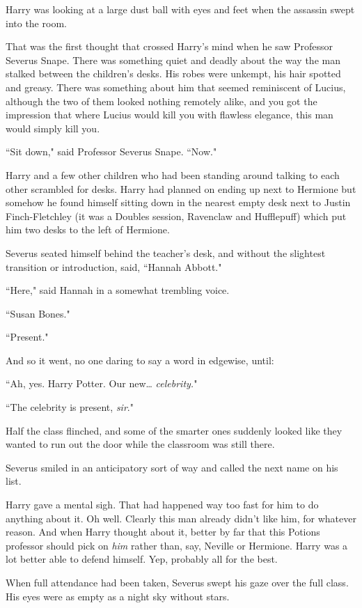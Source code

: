 Harry was looking at a large dust ball with eyes and feet when the assassin swept into the room.

That was the first thought that crossed Harry's mind when he saw Professor Severus Snape. There was something quiet and deadly about the way the man stalked between the children's desks. His robes were unkempt, his hair spotted and greasy. There was something about him that seemed reminiscent of Lucius, although the two of them looked nothing remotely alike, and you got the impression that where Lucius would kill you with flawless elegance, this man would simply kill you.

``Sit down," said Professor Severus Snape. ``Now."

Harry and a few other children who had been standing around talking to each other scrambled for desks. Harry had planned on ending up next to Hermione but somehow he found himself sitting down in the nearest empty desk next to Justin Finch-Fletchley (it was a Doubles session, Ravenclaw and Hufflepuff) which put him two desks to the left of Hermione.

Severus seated himself behind the teacher's desk, and without the slightest transition or introduction, said, ``Hannah Abbott."

``Here," said Hannah in a somewhat trembling voice.

``Susan Bones."

``Present."

And so it went, no one daring to say a word in edgewise, until:

``Ah, yes. Harry Potter. Our new{\ldots} \emph{celebrity.}"

``The celebrity is present, \emph{sir}."

Half the class flinched, and some of the smarter ones suddenly looked like they wanted to run out the door while the classroom was still there.

Severus smiled in an anticipatory sort of way and called the next name on his list.

Harry gave a mental sigh. That had happened way too fast for him to do anything about it. Oh well. Clearly this man already didn't like him, for whatever reason. And when Harry thought about it, better by far that this Potions professor should pick on \emph{him} rather than, say, Neville or Hermione. Harry was a lot better able to defend himself. Yep, probably all for the best.

When full attendance had been taken, Severus swept his gaze over the full class. His eyes were as empty as a night sky without stars.

